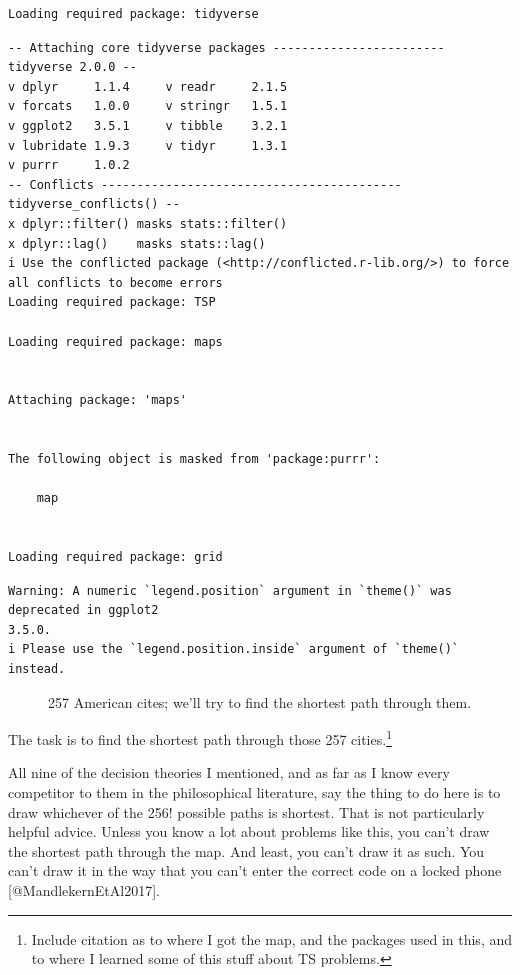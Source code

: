 \documentclass[
  letterpaper,
  DIV=11,
  numbers=noendperiod]{scrartcl}
\begin{document}
\begin{verbatim}
Loading required package: tidyverse
\end{verbatim}

\begin{verbatim}
-- Attaching core tidyverse packages ------------------------ tidyverse 2.0.0 --
v dplyr     1.1.4     v readr     2.1.5
v forcats   1.0.0     v stringr   1.5.1
v ggplot2   3.5.1     v tibble    3.2.1
v lubridate 1.9.3     v tidyr     1.3.1
v purrr     1.0.2     
-- Conflicts ------------------------------------------ tidyverse_conflicts() --
x dplyr::filter() masks stats::filter()
x dplyr::lag()    masks stats::lag()
i Use the conflicted package (<http://conflicted.r-lib.org/>) to force all conflicts to become errors
Loading required package: TSP

Loading required package: maps


Attaching package: 'maps'


The following object is masked from 'package:purrr':

    map


Loading required package: grid
\end{verbatim}

\begin{verbatim}
Warning: A numeric `legend.position` argument in `theme()` was deprecated in ggplot2
3.5.0.
i Please use the `legend.position.inside` argument of `theme()` instead.
\end{verbatim}

\begin{figure}


\caption{\label{fig-map}257 American cites; we'll try to find the
shortest path through them.}

\end{figure}%

The task is to find the shortest path through those 257
cities.\footnote{Include citation as to where I got the map, and the
  packages used in this, and to where I learned some of this stuff about
  TS problems.}

All nine of the decision theories I mentioned, and as far as I know
every competitor to them in the philosophical literature, say the thing
to do here is to draw whichever of the 256! possible paths is shortest.
That is not particularly helpful advice. Unless you know a lot about
problems like this, you can't draw the shortest path through the map.
And least, you can't draw it as such. You can't draw it in the way that
you can't enter the correct code on a locked phone
{[}@MandlekernEtAl2017{]}.
\end{document}

